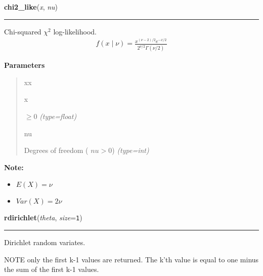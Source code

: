    \begin{boxedminipage}{\textwidth}

    \raggedright \textbf{chi2\_like}(\textit{x}, \textit{nu})

    \vspace{-1.5ex}

    \rule{\textwidth}{0.5\fboxrule}

Chi-squared $\chi^2$ log-likelihood.
\begin{equation*}\begin{split}f(x \mid \nu) = \frac{x^{(\nu-2)/2}e^{-x/2}}{2^{\nu/2}\Gamma(\nu/2)}\end{split}\end{equation*}    \vspace{1ex}

      \textbf{Parameters}
      \begin{quote}
        \begin{Ventry}{xx}

          \item[x]


$\ge 0$
            \textit{(type=float)}

          \item[nu]


Degrees of freedom ( $nu > 0$)
            \textit{(type=int)}

        \end{Ventry}

      \end{quote}

    \vspace{1ex}

\textbf{Note:} \begin{itemize}
\item {} 
$E(X)=\nu$

\item {} 
$Var(X)=2\nu$

\end{itemize}


    \end{boxedminipage}

    \label{pymc:distributions:rdirichlet}

    \vspace{0.5ex}

    \begin{boxedminipage}{\textwidth}

    \raggedright \textbf{rdirichlet}(\textit{theta}, \textit{size}=\texttt{1})

    \vspace{-1.5ex}

    \rule{\textwidth}{0.5\fboxrule}

Dirichlet random variates.

NOTE only the first k-1 values are returned.
The k'th value is equal to one minus the sum of the first k-1 values.
    \vspace{1ex}

    \end{boxedminipage}

